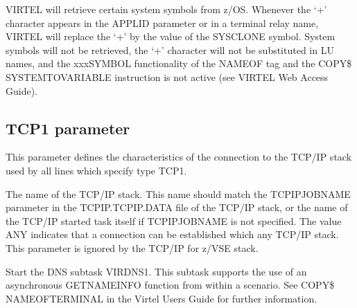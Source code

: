 \documentclass[letterpaper,10pt,english]{sphinxmanual}
\begin{document}
\sphinxAtStartPar
{} \sphinxhyphen{} VIRTEL will retrieve certain system symbols from z/OS. Whenever the ‘+’ character appears in the APPLID parameter or in a terminal relay name, VIRTEL will replace the ‘+’ by the value of the SYSCLONE symbol.
 \sphinxhyphen{} System symbols will not be retrieved, the ‘+’ character will not be substituted in LU names, and the xxx\sphinxhyphen{}SYMBOL functionality of the NAME\sphinxhyphen{}OF tag and the COPY\$ SYSTEM\sphinxhyphen{}TO\sphinxhyphen{}VARIABLE instruction is not active (see VIRTEL Web Access Guide).

\ignorespaces 

\subsection{TCP1 parameter}
\label{\detokenize{Installation_Guide:tcp1-parameter}}\label{\detokenize{Installation_Guide:index-123}}
\begin{sphinxVerbatim}[commandchars=\\\{\}]
   
\PYG{p}{[}\PYG{p}{]}\PYG{p}{[}\PYG{p}{]}\PYG{p}{[}\PYG{p}{]}\PYG{p}{[}\PYG{p}{]}\PYG{p}{[}\PYG{p}{]}
\end{sphinxVerbatim}

\sphinxAtStartPar
This parameter defines the characteristics of the connection to the TCP/IP stack used by all lines which specify type TCP1.

\sphinxAtStartPar
{} \sphinxhyphen{} The name of the TCP/IP stack. This name should match the TCPIPJOBNAME parameter in the TCPIP.TCPIP.DATA file of the TCP/IP stack, or the name of the TCP/IP started task itself if TCPIPJOBNAME is not specified. The value ANY indicates that a connection can be established which any TCP/IP stack. This parameter is ignored by the TCP/IP for z/VSE stack.

\sphinxAtStartPar
{} \sphinxhyphen{}  Start the DNS subtask VIRDNS1. This subtask supports the use of an asynchronous GETNAMEINFO function from within a scenario. See COPY\$ NAME\sphinxhyphen{}OF\sphinxhyphen{}TERMINAL in the Virtel Users Guide for further information.
\end{document}
